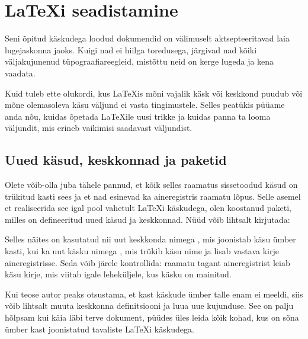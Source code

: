 \chapter{\LaTeX i seadistamine}

\begin{intro}
Seni õpitud käskudega loodud dokumendid on välimuselt aktsepteeritavad
laia lugejaskonna jaoks. Kuigi nad ei hiilga toredusega, järgivad nad
kõiki väljakujunenud tüpograafiareegleid, mistõttu neid on kerge lugeda
ja kena vaadata.

Kuid tuleb ette olukordi, kus \LaTeX is mõni vajalik käsk või keskkond
puudub või mõne olemasoleva käsu väljund ei vasta tingimustele. Selles
peatükis püüame anda nõu, kuidas õpetada \LaTeX ile uusi trikke ja
kuidas panna ta looma väljundit, mis erineb vaikimisi saadavast
väljundist.
\end{intro}

\section{Uued käsud, keskkonnad ja paketid}

Olete võib-olla juba tähele pannud, et kõik selles raamatus sissetoodud
käsud on trükitud kasti sees ja et nad esinevad ka aineregistris raamatu
lõpus. Selle asemel et realiseerida see igal pool vahetult \LaTeX i
käskudega, olen koostanud paketi, milles on defineeritud uued
käsud ja keskkonnad. Nüüd võib lihtsalt kirjutada:

\begin{example}
\begin{lscommand}
\end{lscommand}
\end{example}

Selles näites on kasutatud nii uut keskkonda nimega , mis
joonistab käsu ümber kasti, kui ka uut käsku nimega , mis trükib
käsu nime ja lisab vastava kirje aineregistrisse. Seda võib järele
kontrollida: raamatu tagant aineregistrist leiab käsu  kirje,
mis viitab igale leheküljele, kus käsku  on mainitud.

Kui teose autor peaks otsustama, et kast käskude ümber talle enam ei
meeldi, siis võib lihtsalt muuta keskkonna 
definitsiooni ja luua uue kujunduse. See on palju hõlpsam kui käia läbi
terve dokument, püüdes üles leida kõik kohad, kus on sõna ümber kast
joonistatud tavaliste \LaTeX i käskudega.

